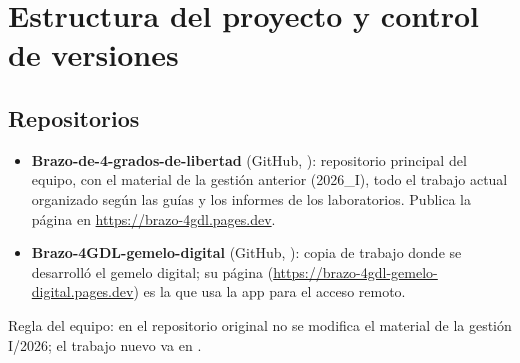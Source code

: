\chapter{Estructura del proyecto y control de versiones}\label{cap:proyecto}

\section{Repositorios}
\begin{itemize}
\item \textbf{Brazo-de-4-grados-de-libertad} (GitHub, ): repositorio principal del equipo, con el material de la gestión anterior (2026\_I), todo el trabajo actual organizado según las guías y los informes de los laboratorios. Publica la página en \url{https://brazo-4gdl.pages.dev}.
\item \textbf{Brazo-4GDL-gemelo-digital} (GitHub, ): copia de trabajo donde se desarrolló el gemelo digital; su página (\url{https://brazo-4gdl-gemelo-digital.pages.dev}) es la que usa la app para el acceso remoto.
\end{itemize}
Regla del equipo: en el repositorio original no se modifica el material de la gestión I/2026; el trabajo nuevo va en .

